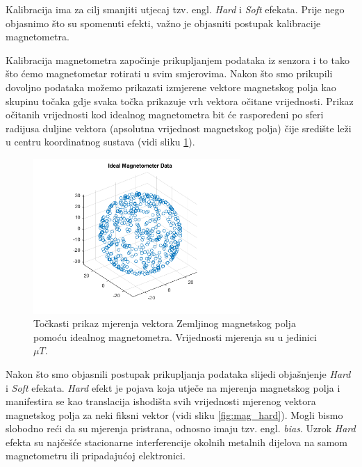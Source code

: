 \documentclass[times, utf8, diplomski, numeric]{templates/template}
\begin{document}
{{{{                Kalibracija ima za cilj smanjiti utjecaj tzv. engl. \emph{Hard} i \emph{Soft} efekata. Prije nego objasnimo što su spomenuti efekti, važno je objasniti postupak kalibracije magnetometra. 

                Kalibracija magnetometra započinje prikupljanjem podataka iz senzora i to tako što ćemo magnetometar rotirati u svim smjerovima. Nakon što smo prikupili dovoljno podataka možemo prikazati izmjerene vektore magnetskog polja kao skupinu točaka gdje svaka točka prikazuje vrh vektora očitane vrijednosti. Prikaz očitanih vrijednosti kod idealnog magnetometra bit će raspoređeni po sferi radijusa duljine vektora (apsolutna vrijednost magnetskog polja) čije središte leži u centru koordinatnog sustava (vidi sliku \ref{fig:mag_ideal}).

                \begin{figure}[htb]
                \centering
                \includegraphics[width=0.7\textwidth]{images/mag_ideal.png}
                \caption{Točkasti prikaz mjerenja vektora Zemljinog magnetskog polja pomoću idealnog magnetometra. Vrijednosti mjerenja su u jedinici $\mu T$.}
                \label{fig:mag_ideal}
                \end{figure}

                Nakon što smo objasnili postupak prikupljanja podataka slijedi objašnjenje \emph{Hard} i \emph{Soft} efekata. \emph{Hard} efekt je pojava koja utječe na mjerenja magnetskog polja i manifestira se kao translacija ishodišta svih vrijednosti mjerenog vektora magnetskog polja za neki fiksni vektor (vidi sliku \ref{fig:mag_hard}). Mogli bismo slobodno reći da su mjerenja pristrana, odnosno imaju tzv. engl. \emph{bias}. Uzrok \emph{Hard} efekta su najčešće stacionarne interferencije okolnih metalnih dijelova na samom magnetometru ili pripadajućoj elektronici. 

}}}}
\end{document}
